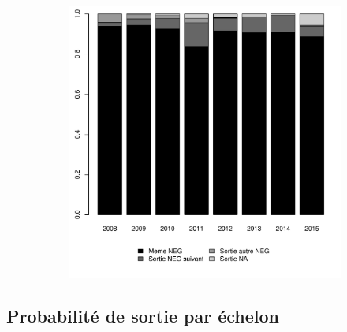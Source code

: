 \documentclass[11pt,a4paper]{article}
\begin{document}
\begin{figure}[ht]
\begin{subfigure}[b]{0.65\linewidth}
    \includegraphics[width=1\linewidth]{destination_AA_1.pdf} 
    \vspace{4ex}
  \end{subfigure} 
\end{figure}






\clearpage
\subsection{Probabilité de sortie par échelon}
\end{document}
